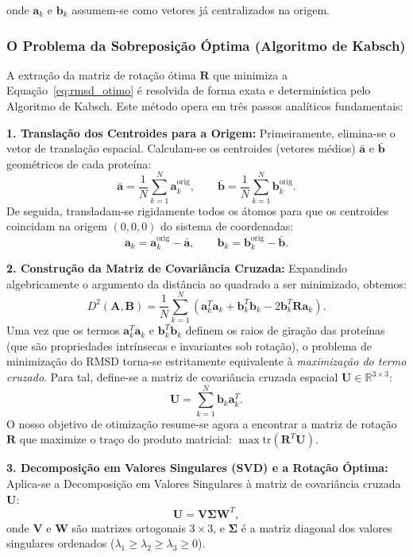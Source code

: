 \documentclass[12pt, a4paper]{article}
\begin{document}
onde $\mathbf{a}_k$ e $\mathbf{b}_k$ assumem-se como vetores já centralizados na origem.

\subsubsection{O Problema da Sobreposição Óptima (Algoritmo de Kabsch)}

A extração da matriz de rotação ótima $\mathbf{R}$ que minimiza a Equação~\ref{eq:rmsd_otimo} é resolvida de forma exata e determinística pelo Algoritmo de Kabsch. Este método opera em três passos analíticos fundamentais:

\textbf{1. Translação dos Centroides para a Origem:}
Primeiramente, elimina-se o vetor de translação espacial. Calculam-se os centroides (vetores médios) $\bar{\mathbf{a}}$ e $\bar{\mathbf{b}}$ geométricos de cada proteína:
\[
\bar{\mathbf{a}} = \frac{1}{N} \sum_{k=1}^N \mathbf{a}_k^{\text{orig}}, \qquad \bar{\mathbf{b}} = \frac{1}{N} \sum_{k=1}^N \mathbf{b}_k^{\text{orig}}.
\]
De seguida, transladam-se rigidamente todos os átomos para que os centroides coincidam na origem $(0,0,0)$ do sistema de coordenadas:
\[
\mathbf{a}_k = \mathbf{a}_k^{\text{orig}} - \bar{\mathbf{a}}, \qquad \mathbf{b}_k = \mathbf{b}_k^{\text{orig}} - \bar{\mathbf{b}}.
\]

\textbf{2. Construção da Matriz de Covariância Cruzada:}
Expandindo algebricamente o argumento da distância ao quadrado a ser minimizado, obtemos:
\[
D^2(\mathbf{A}, \mathbf{B}) = \frac{1}{N} \sum_{k=1}^N \left( \mathbf{a}_k^T \mathbf{a}_k + \mathbf{b}_k^T \mathbf{b}_k - 2 \mathbf{b}_k^T \mathbf{R} \mathbf{a}_k \right).
\]
Uma vez que os termos $\mathbf{a}_k^T \mathbf{a}_k$ e $\mathbf{b}_k^T \mathbf{b}_k$ definem os raios de giração das proteínas (que são propriedades intrínsecas e invariantes sob rotação), o problema de minimização do RMSD torna-se estritamente equivalente à \emph{maximização do termo cruzado}. Para tal, define-se a matriz de covariância cruzada espacial $\mathbf{U} \in \mathbb{R}^{3 \times 3}$:
\begin{equation}\label{eq:matriz_covariancia}
\mathbf{U} = \sum_{k=1}^N \mathbf{b}_k \mathbf{a}_k^T.
\end{equation}
O nosso objetivo de otimização resume-se agora a encontrar a matriz de rotação $\mathbf{R}$ que maximize o traço do produto matricial: $\max \mathrm{tr}(\mathbf{R}^T \mathbf{U})$.

\textbf{3. Decomposição em Valores Singulares (SVD) e a Rotação Óptima:}
Aplica-se a Decomposição em Valores Singulares à matriz de covariância cruzada $\mathbf{U}$:
\begin{equation}
\mathbf{U} = \mathbf{V} \mathbf{\Sigma} \mathbf{W}^T,
\end{equation}
onde $\mathbf{V}$ e $\mathbf{W}$ são matrizes ortogonais $3 \times 3$, e $\mathbf{\Sigma}$ é a matriz diagonal dos valores singulares ordenados ($\lambda_1 \geq \lambda_2 \geq \lambda_3 \geq 0$). 
\end{document}
